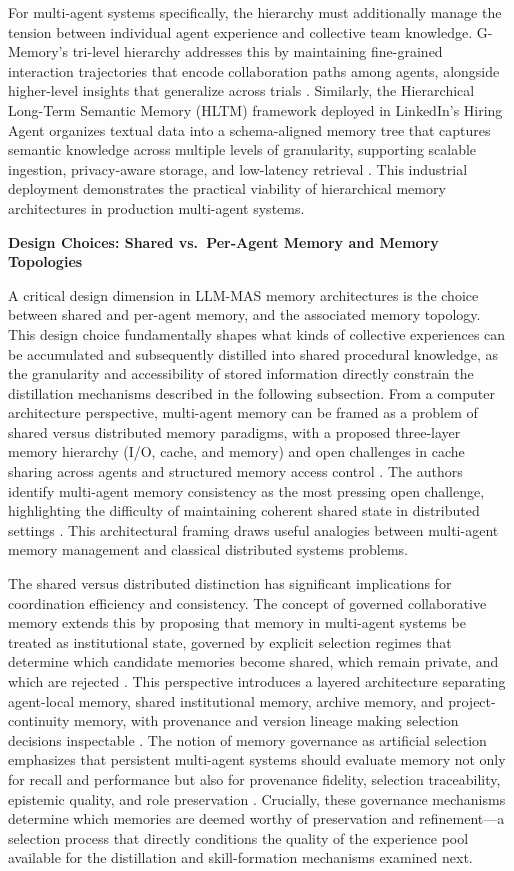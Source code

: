 \documentclass[11pt]{article}
\begin{document}
For multi-agent systems specifically, the hierarchy must additionally manage the tension between individual agent experience and collective team knowledge. G-Memory's tri-level hierarchy addresses this by maintaining fine-grained interaction trajectories that encode collaboration paths among agents, alongside higher-level insights that generalize across trials \cite{ref118}. Similarly, the Hierarchical Long-Term Semantic Memory (HLTM) framework deployed in LinkedIn's Hiring Agent organizes textual data into a schema-aligned memory tree that captures semantic knowledge across multiple levels of granularity, supporting scalable ingestion, privacy-aware storage, and low-latency retrieval \cite{ref123}. This industrial deployment demonstrates the practical viability of hierarchical memory architectures in production multi-agent systems.

\textbf{Design Choices: Shared vs.~Per-Agent Memory and Memory Topologies}

A critical design dimension in LLM-MAS memory architectures is the choice between shared and per-agent memory, and the associated memory topology. This design choice fundamentally shapes what kinds of collective experiences can be accumulated and subsequently distilled into shared procedural knowledge, as the granularity and accessibility of stored information directly constrain the distillation mechanisms described in the following subsection. From a computer architecture perspective, multi-agent memory can be framed as a problem of shared versus distributed memory paradigms, with a proposed three-layer memory hierarchy (I/O, cache, and memory) and open challenges in cache sharing across agents and structured memory access control \cite{ref124}. The authors identify multi-agent memory consistency as the most pressing open challenge, highlighting the difficulty of maintaining coherent shared state in distributed settings \cite{ref124}. This architectural framing draws useful analogies between multi-agent memory management and classical distributed systems problems.

The shared versus distributed distinction has significant implications for coordination efficiency and consistency. The concept of governed collaborative memory extends this by proposing that memory in multi-agent systems be treated as institutional state, governed by explicit selection regimes that determine which candidate memories become shared, which remain private, and which are rejected \cite{ref125}. This perspective introduces a layered architecture separating agent-local memory, shared institutional memory, archive memory, and project-continuity memory, with provenance and version lineage making selection decisions inspectable \cite{ref125}. The notion of memory governance as artificial selection emphasizes that persistent multi-agent systems should evaluate memory not only for recall and performance but also for provenance fidelity, selection traceability, epistemic quality, and role preservation \cite{ref125}. Crucially, these governance mechanisms determine which memories are deemed worthy of preservation and refinement---a selection process that directly conditions the quality of the experience pool available for the distillation and skill-formation mechanisms examined next.
\end{document}
